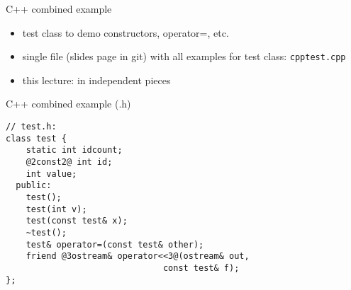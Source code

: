 \begin{frame}[fragile,label=overExOver]{C++ combined example}
    \begin{itemize}
    \item test class to demo constructors, operator=, etc.
    \item single file (slides page in git) with all examples for test class: \texttt{cpptest.cpp}
    \item this lecture: in independent pieces
    \end{itemize}
\end{frame}


\begin{frame}[fragile,label=overEx]{C++ combined example (.h)}
\begin{lstlisting}
// test.h:
class test {
    static int idcount;
    @2const2@ int id;
    int value;
  public:
    test();
    test(int v);
    test(const test& x);
    ~test();
    test& operator=(const test& other);
    friend @3ostream& operator<<3@(ostream& out,
                               const test& f);
};
\end{lstlisting}
\end{frame}


